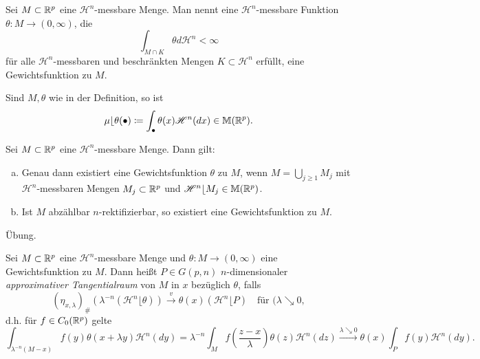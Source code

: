 \documentclass[a4paper,twoside,DIV15,BCOR12mm]{scrbook}
\newcommand{\HM}{\mathscr H}
\DeclareMathOperator{\downto}{\searrow}
\newcommand{\MR}{\lfloor}
\begin{document}
\begin{definition}
Sei \(M \subset \mathbb{R}^p\) eine \(\HM^n\)-messbare Menge. Man nennt eine \(\HM^n\)-messbare  Funktion \(\theta: M \to (0,\infty)\), die 
\[
\int_{M\cap K} \theta d\HM^n < \infty
\]
für alle \(\HM^n\)-messbaren und beschränkten Mengen \(K \subset \HM^n\)  erfüllt, 
eine Gewichtsfunktion zu \(M\).
\end{definition}

\begin{bemerkung}
Sind \(M, \theta\) wie in der Definition, so ist
\[
\mu\MR\theta(\bullet) \da \int_\bullet \theta(x) \HM^n(dx) \in \mathbb M(\MdR^p).
\]
\end{bemerkung}

\begin{lemma}\label{lem:3.23}
Sei \(M \subset \mathbb{R}^p\) eine \(\HM^n\)-messbare Menge. Dann gilt:
\begin{enumerate}[(a)]
\item Genau dann existiert eine Gewichtsfunktion \(\theta\) zu \(M\), wenn \(M = \bigcup_{j\geq1} M_j\) mit \(\HM^n\)-messbaren Mengen \(M_j \subset \mathbb{R}^p\) und \(\HM^n \MR M_j \in \mathbb M(\MdR^p)\).
\item Ist \(M\) abzählbar \(n\)-rektifizierbar, so existiert eine Gewichtsfunktion zu \(M\).
\end{enumerate}
\end{lemma}
\begin{beweis} Übung. \end{beweis}

\begin{definition}
Sei \(M \subset \mathbb{R}^p\) eine \( \HM^n\)-messbare Menge und \(\theta: M \to (0,\infty)\) eine Gewichtsfunktion zu \(M\). Dann heißt \(P \in G(p,n)\) \(n\)-dimensionaler \emph{approximativer Tangentialraum} von \(M\) in \(x\) bezüglich \(\theta\), falls
\[
(\eta_{x,\lambda})_\# \left(\lambda^{-n}(\HM^n\MR \theta)\right) \overset{v}\to \theta(x) (\HM^n \MR P) \quad \text{für }(\lambda\downto0,
\]
d.h. für \(f\in C_0(\mathbb{R}^p)\) gelte
\[
\int_{\lambda^{-n}(M-x)} f(y) \theta(x+\lambda y) \HM^n(dy) = \lambda^{-n} \int_M f(\frac{z-x}\lambda) \theta(z) \HM^n(dz) \xrightarrow{\lambda\downto0} \theta(x) \int_P f(y) \HM^n(dy).
\]
\end{definition}
\end{document}
